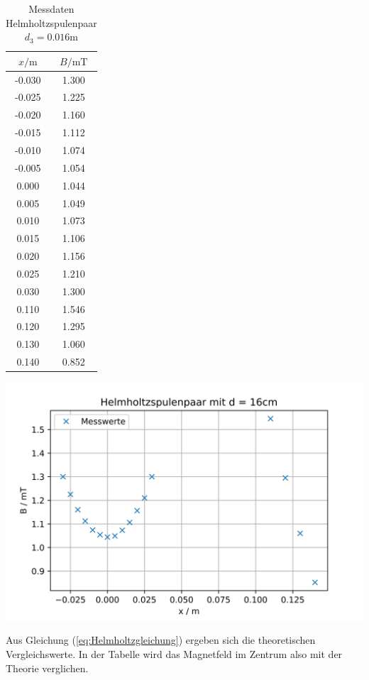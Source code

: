 \begin{table}
  \centering
  \caption{Messdaten Helmholtzspulenpaar $d_{3} = 0.016\unit\m$}
  \begin{tabular}{c c}
    \toprule
    $x / \unit\m$ &  $B / \unit{\milli\tesla}$ \\
    \midrule
    -0.030 &        1.300 \\
    -0.025 &        1.225 \\
    -0.020 &        1.160 \\
    -0.015 &        1.112 \\
    -0.010 &        1.074 \\
    -0.005 &        1.054 \\
     0.000 &        1.044 \\
     0.005 &        1.049 \\
     0.010 &        1.073 \\
     0.015 &        1.106 \\
     0.020 &        1.156 \\
     0.025 &        1.210 \\
     0.030 &        1.300 \\
     0.110 &        1.546 \\
     0.120 &        1.295 \\
     0.130 &        1.060 \\
     0.140 &        0.852 \\
    \bottomrule
  \end{tabular}
\end{table}

  \includegraphics[width=\textwidth]{pictures/Helmholtz3.png}

  Aus Gleichung (\ref{eq:Helmholtzgleichung}) ergeben sich die theoretischen Vergleichswerte.
  In der Tabelle wird das Magnetfeld im Zentrum also mit der Theorie verglichen.

